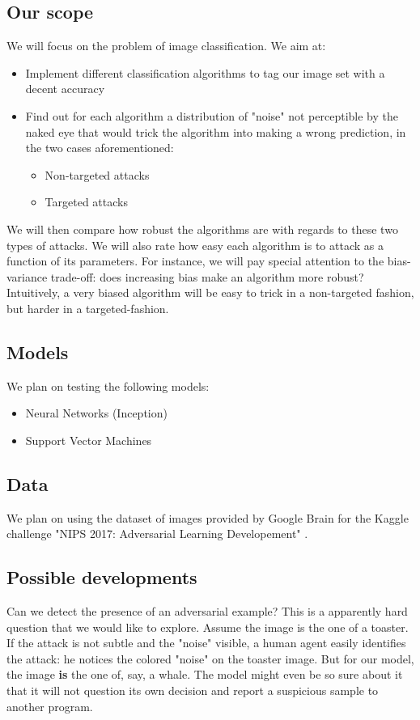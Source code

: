 \documentclass{article}
\begin{document}
\subsection{Our scope}
We will focus on the problem of image classification.
We aim at:

\begin{itemize}
    \item Implement different classification algorithms to tag our image set with a decent accuracy
    \item Find out for each algorithm a distribution of "noise" not perceptible by the naked eye that would trick the algorithm into making a wrong prediction, in the two cases aforementioned:
    \begin{itemize}
        \item Non-targeted attacks
        \item Targeted attacks
    \end{itemize}
\end{itemize}

We will then compare how robust the algorithms are with regards to these two types of attacks. We will also rate how easy each algorithm is to attack as a function of its parameters. For instance, we will pay special attention to the bias-variance trade-off: does increasing bias make an algorithm more robust? Intuitively, a very biased algorithm will be easy to trick in a non-targeted fashion, but harder in a targeted-fashion.
\subsection{Models}
We plan on testing the following models:

\begin{itemize}
    \item Neural Networks (Inception)
    \item Support Vector Machines
\end{itemize}

\subsection{Data}
We plan on using the dataset of images provided by Google Brain for the Kaggle challenge "NIPS 2017: Adversarial Learning Developement" \cite{a2}.

\subsection{Possible developments}
Can we detect the presence of an adversarial example?
This is a apparently hard question that we would like to explore. Assume the image is the one of a toaster. If the attack is not subtle and the "noise" visible, a human agent easily identifies the attack: he notices the colored "noise" on the toaster image. But for our model, the image \textbf{is} the one of, say, a whale. The model might even be so sure about it that it will not question its own decision and report a suspicious sample to another program.
\end{document}
